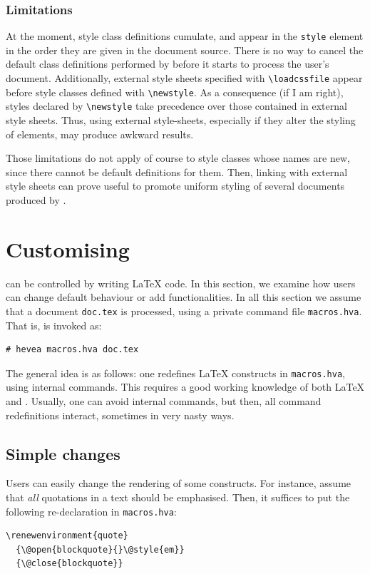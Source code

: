 \subsubsection{Limitations}
At the moment, style class definitions cumulate, and appear
in the \verb+style+ element in the order they are given in the
document source. There is no way to cancel the default class
definitions performed by \hevea{} before it starts to process the
user's document.
Additionally, external style sheets specified with \verb+\loadcssfile+
appear before style classes defined with \verb+\newstyle+.
As a consequence (if I am right), styles
declared by \verb+\newstyle+ take precedence over those contained in
external style sheets. Thus, using external style-sheets, especially
if they alter the styling of elements, may produce awkward results.

Those limitations do not apply of course to style classes whose
names are new, since there cannot be default definitions for them.
Then, linking with external style sheets can prove useful to
promote uniform styling of several documents produced by \hevea{}.


\section{Customising\label{macros.hva} \hevea}
\hevea{} can be controlled by writing \LaTeX{} code. In this section,
we examine how users can change \hevea{} default behaviour or add
functionalities. In all this section we assume that a document
\texttt{doc.tex} is processed, using a private command file
\texttt{macros.hva}. That is, \hevea{} is invoked as:
\begin{verbatim}
# hevea macros.hva doc.tex
\end{verbatim}
The general idea is as follows: one redefines \LaTeX{} constructs in
\texttt{macros.hva}, using internal commands. This requires a good
working knowledge of both \LaTeX{} and \html.
Usually, one can avoid internal commands, but then, all command
redefinitions interact, sometimes in very nasty ways.


\subsection{Simple changes}
Users can easily change the rendering of some constructs. For
instance, assume that \emph{all} quotations in a text should be
emphasised. Then, it suffices to put the following re-declaration in
\texttt{macros.hva}:
\begin{verbatim}
\renewenvironment{quote}
  {\@open{blockquote}{}\@style{em}}
  {\@close{blockquote}}
\end{verbatim}

